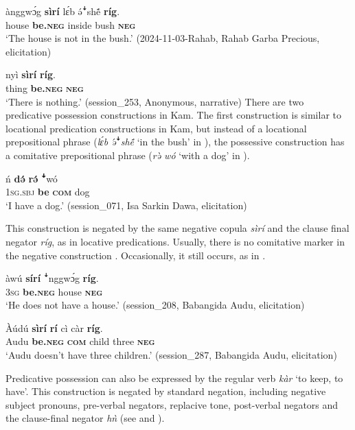 \documentclass[output=paper,colorlinks,citecolor=brown]{langscibook}
\begin{document}
\ea\label{ex:kam:44} 
    \gll ànggwɔ́g  \textbf{sìrí} lɛ́b ə́ꜜsh\'{ẽ}  \textbf{ríg}.\\ 
        house  \textbf{be.\textsc{neg}} inside bush \textbf{\textsc{neg}}\\
    \glt ‘The house is not in the bush.’ (2024-11-03-Rahab, Rahab Garba Precious, elicitation)
\z 


\ea\label{ex:kam:45} 
    \gll nyì \textbf{sìrí} \textbf{ríg}.\\
        thing \textbf{be.\textsc{neg}} \textbf{\textsc{neg}}\\
    \glt ‘There is nothing.’ (session\_253, Anonymous, narrative)
\z 
There are two predicative possession constructions in Kam. The first construction is similar to locational predication constructions in Kam, but instead of a locational prepositional phrase (\textit{lɛ́b ə}́ꜜ\textit{sh\'{ẽ}} ‘in the bush’ in ), the possessive construction has a comitative prepositional phrase (\textit{rə̀ wó} ‘with a dog’ in ).


\ea\label{ex:kam:46} 
    \gll ń \textbf{də́} \textbf{rə́} \textbf{ꜜ}wó\\
        1\textsc{sg.sbj} \textbf{be} \textbf{\textsc{com}} dog\\
    \glt ‘I have a dog.’ (session\_071, Isa Sarkin Dawa, elicitation)
\z 

This construction is negated by the same negative copula \textit{sìrí} and the clause final negator \textit{ríg}, as in locative predications. Usually, there is no comitative marker in the negative construction . Occasionally, it still occurs, as in .

\ea\label{ex:kam:47} 
    \gll àwú \textbf{sírí} ꜜnggwɔ́g \textbf{ríg}.\\ 
        \textsc{3sg} \textbf{be.\textsc{neg}} house \textbf{\textsc{neg}}\\
    \glt ‘He does not have a house.’ (session\_208, Babangida Audu, elicitation)
\z 

\ea\label{ex:kam:48} 
    \gll Àúdú \textbf{sìrí} \textbf{rí} cì càr \textbf{ríg}.\\
        Audu \textbf{be.\textsc{neg}} \textbf{\textsc{com}} child three \textbf{\textsc{neg}} \\
    \glt ‘Audu doesn’t have three children.’ (session\_287, Babangida Audu, elicitation)
\z 

Predicative possession can also be expressed by the regular verb \textit{kàr} ‘to keep, to have’. This construction is negated by standard negation, including negative subject pronouns, pre-verbal negators, replacive tone, post-verbal negators and the clause-final negator \textit{hǹ} (see  and ).
\end{document}

